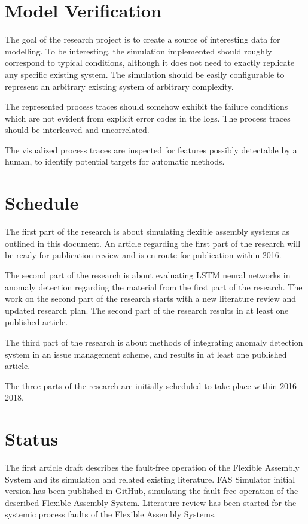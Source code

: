 \documentclass[a4paper,10pt]{article}
\begin{document}
\section{Model Verification}

The goal of the research project is to create a source of interesting data for modelling. To be interesting, the simulation implemented should roughly correspond to typical
conditions, although it does not need to exactly replicate any specific existing system. The simulation should be easily configurable to represent an arbitrary existing system
of arbitrary complexity.

The represented process traces should somehow exhibit the failure conditions
which are not evident from explicit error codes in the logs. The process traces should be interleaved and uncorrelated.

The visualized process traces are inspected for features possibly detectable by a human, to identify potential targets for automatic methods.

\section{Schedule}

The first part of the research is about simulating flexible assembly systems as outlined in this document.
An article regarding the first part of the research will be ready for publication review and is en route for publication within 2016.

The second part of the research is about evaluating LSTM neural networks in anomaly detection regarding the material from the first part of the research.
The work on the second part of the research starts with a new literature review and updated research plan. The second part of the research results in at least one published article.

The third part of the research is about methods of integrating anomaly detection system in an issue management scheme, and results in at least one published article.

The three parts of the research are initially scheduled to take place within 2016-2018.\cite{kuha}

\section{Status}

The first article draft describes the fault-free operation of the Flexible Assembly System and its simulation and related existing literature.
FAS Simulator initial version has been published in GitHub, simulating the fault-free operation of the described Flexible Assembly System.
Literature review has been started for the systemic process faults of the Flexible Assembly Systems.



\end{document}
